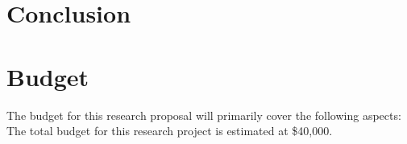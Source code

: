 \documentclass[a4paper,man,12pt]{article}
\begin{document}
\section{Conclusion}

  
  \lipsum[2]
  \paragraph{}
  
  
  \lipsum[2]




\section{Budget}

  
  The budget for this research proposal will primarily cover the following aspects:
  The total budget for this research project is estimated at \$40,000.

  
\end{document}
